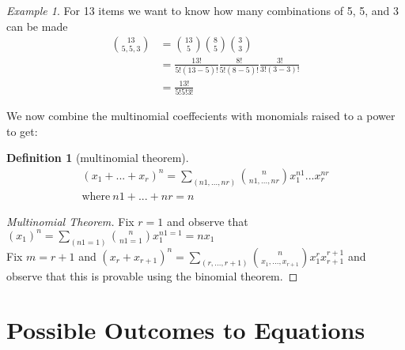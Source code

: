 \documentclass{article}
\theoremstyle{plain}
\theoremstyle{definition}
\newtheorem{definition}{Definition}
\theoremstyle{remark}
\newtheorem{example}{Example}
\begin{document}
\begin{example}
  For 13 items we want to know how many combinations of 5, 5, and 3 can be made
  \begin{align*}
    \binom{13}{5,5,3} &= \binom{13}{5}\binom{8}{5}\binom{3}{3} \\
                      &= \frac{13!}{5!(13-5)!}\frac{8!}{5!(8-5)!}\frac{3!}{3!(3-3)!} \\
                      &=\frac{13!}{5!5!3!}
  \end{align*}
\end{example}
We now combine the multinomial coeffecients with monomials raised to a power to get:
\begin{definition}[multinomial theorem]
  \begin{align*}
    (x_1+...+x_r)^n = \sum_{(n1,...,nr)}\binom{n}{n1,...,nr}x_1^{n1}...x_r^{nr} \\
    \text{where}\ n1 + ... + nr = n
  \end{align*}
\end{definition}
\begin{proof}[Multinomial Theorem]
  Fix $r = 1$ and observe that $(x_1)^n=\sum_{(n1 = 1)}\binom{n}{n1 = 1}x_1^{n1 = 1} = nx_1$ \\
  Fix $m = r + 1$ and $(x_r + x_{r+1})^n = \sum_{(r, ..., r+1)}\binom{n}{x_1,...,x_{r+1}}x_1^rx_{r+1}^{r+1}$  and observe that this is provable using the binomial theorem.
\end{proof}

\section{Possible Outcomes to Equations}
\end{document}
